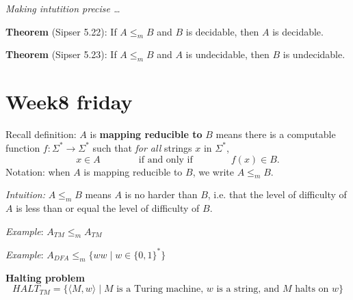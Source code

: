 \documentclass[12pt, oneside]{article}
\begin{document}
{\it Making intutition precise \ldots}

{\bf Theorem} (Sipser 5.22): If $A \leq_m B$ and $B$ is decidable, then $A$ is decidable.
    
\vfill


{\bf Theorem} (Sipser 5.23): If $A \leq_m B$ and $A$ is undecidable, then $B$ is undecidable.
    
\vfill
 \vfill
\section*{Week8 friday}



Recall definition:  $A$ is  {\bf  mapping  reducible to} $B$  means there is a computable function 
$f : \Sigma^* \to \Sigma^*$ such that {\it for all} strings  $x$ in $\Sigma^*$, 
\[
x  \in  A \qquad \qquad \text{if and  only  if} \qquad \qquad f(x) \in B.
\]
Notation:  when $A$  is mapping reducible to $B$, we write $A  \leq_m B$.

{\it Intuition:} $A \leq_m B$ means $A$ is no harder than $B$, i.e. that the level 
of difficulty of $A$ is less than or equal the level of difficulty of $B$.


{\it Example}: $A_{TM} \leq_m A_{TM}$ 

\vfill

{\it Example}: $A_{DFA} \leq_m \{ ww \mid  w \in \{0,1\}^* \}$ 

\vfill






\newpage

    {\bf Halting problem}
    \[
    HALT_{TM} = \{ \langle M, w \rangle \mid \text{$M$ is a  Turing machine, $w$ is  a string, and $M$ halts on $w$} \}
    \]
    
\end{document}
